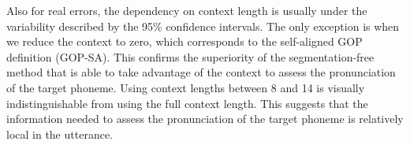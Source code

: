 Also for real errors, the dependency on context length is usually under the variability described by the 95\% confidence intervals.
The only exception is when we reduce the context to zero, which corresponds to the self-aligned GOP definition (GOP-SA).
This confirms the superiority of the segmentation-free method that is able to take advantage of the context to assess the pronunciation of the target phoneme.
Using context lengths between 8 and 14 is visually indistinguishable from using the full context length.
This suggests that the information needed to assess the pronunciation of the target phoneme is relatively local in the utterance.

